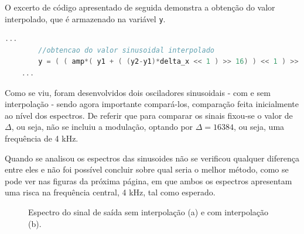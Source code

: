 \documentclass[11pt]{article}
\numberwithin{equation}{section}
\begin{document}
O excerto de código apresentado de seguida demonstra a obtenção do valor interpolado, que é armazenado na variável \texttt{y}. 

\begin{lstlisting}[language=C]
	...
		//obtencao do valor sinusoidal interpolado 
		y = ( ( amp*( y1 + ( (y2-y1)*delta_x << 1 ) >> 16) ) << 1 ) >> 16);
	...
\end{lstlisting}

Como se viu, foram desenvolvidos dois osciladores sinusoidais - com e sem interpolação - sendo agora importante compará-los, comparação feita inicialmente ao nível dos espectros. De referir que para comparar os sinais fixou-se o valor de $\Delta$, ou seja, não se incluiu a modulação, optando por $\Delta = 16384$, ou seja, uma frequência de 4 kHz. 

Quando se analisou os espectros das sinusoides não se verificou qualquer diferença entre eles e não foi possível concluir sobre qual seria o melhor método, como se pode ver nas figuras da próxima página, em que ambos os espectros apresentam uma risca na frequência central, 4 kHz, tal como esperado.

\begin{figure}[H]
	\centering
	\hspace{8mm}
	\vspace{-0.8em}
	\caption{Espectro do sinal de saída sem interpolação (a) e com interpolação (b).}
	\vspace{-0.8em}
\end{figure}
\end{document}
